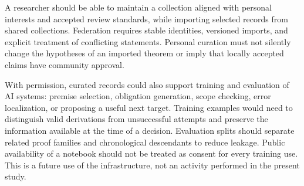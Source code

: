 A researcher should be able to maintain a collection aligned with personal interests and accepted review standards, while importing selected records from shared collections. Federation requires stable identities, versioned imports, and explicit treatment of conflicting statements. Personal curation must not silently change the hypotheses of an imported theorem or imply that locally accepted claims have community approval.

With permission, curated records could also support training and evaluation of AI systems: premise selection, obligation generation, scope checking, error localization, or proposing a useful next target. Training examples would need to distinguish valid derivations from unsuccessful attempts and preserve the information available at the time of a decision. Evaluation splits should separate related proof families and chronological descendants to reduce leakage. Public availability of a notebook should not be treated as consent for every training use. This is a future use of the infrastructure, not an activity performed in the present study.
